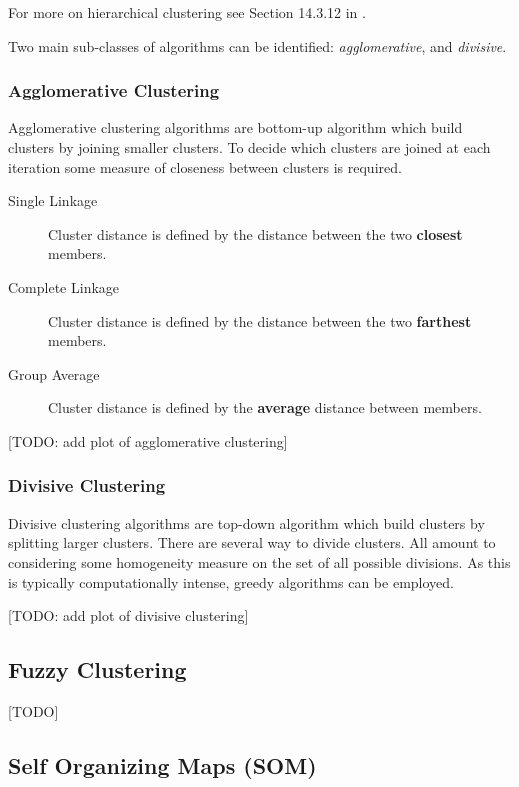 For more on hierarchical clustering see Section 14.3.12 in \cite{hastie_elements_2003}.

Two main sub-classes of algorithms can be identified: \emph{agglomerative}, and \emph{divisive}.
\subsubsection{Agglomerative Clustering}
Agglomerative clustering algorithms are bottom-up algorithm which build clusters by joining smaller clusters. 
To decide which clusters are joined at each iteration some measure of closeness between clusters is required. 
\begin{description}
\item[Single Linkage] Cluster distance is defined by the distance between the two \textbf{closest} members.
\item[Complete Linkage] Cluster distance is defined by the distance between the two \textbf{farthest} members.
\item[Group Average] Cluster distance is defined by the \textbf{average} distance between members.
\end{description}


[TODO: add plot of agglomerative clustering]

\subsubsection{Divisive Clustering}
Divisive clustering algorithms are top-down algorithm which build clusters by splitting larger clusters. 
There are several way to divide clusters. All amount to considering some homogeneity measure on the set of all possible divisions. As this is typically computationally intense, greedy algorithms can be employed.


[TODO: add plot of divisive clustering]




\subsection{Fuzzy Clustering}
\label{sec:fuzzy_clustering}
[TODO]




\subsection{Self Organizing Maps (SOM)}
\label{sec:som}



